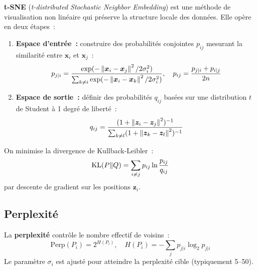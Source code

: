 \begin{definition}[t-SNE]
\textbf{t-SNE} (\emph{t-distributed Stochastic Neighbor Embedding}) est une
m\'ethode de visualisation non lin\'eaire qui pr\'eserve la structure locale
des donn\'ees. Elle op\`ere en deux \'etapes~:

\begin{enumerate}
  \item \textbf{Espace d'entr\'ee~:} construire des probabilit\'es conjointes
    $p_{ij}$ mesurant la similarit\'e entre $\bm{x}_i$ et $\bm{x}_j$~:
    \begin{equation}
      p_{j|i} = \frac{\exp(-\left\| \bm{x}_i - \bm{x}_j \right\|^2 / 2\sigma_i^2)}
      {\sum_{k \neq i} \exp(-\left\| \bm{x}_i - \bm{x}_k \right\|^2 / 2\sigma_i^2)},
      \quad p_{ij} = \frac{p_{j|i} + p_{i|j}}{2n}
    \end{equation}

  \item \textbf{Espace de sortie~:} d\'efinir des probabilit\'es $q_{ij}$
    bas\'ees sur une distribution $t$ de Student \`a 1 degr\'e de libert\'e~:
    \begin{equation}
      q_{ij} = \frac{(1 + \left\| \bm{z}_i - \bm{z}_j \right\|^2)^{-1}}
      {\sum_{k \neq l} (1 + \left\| \bm{z}_k - \bm{z}_l \right\|^2)^{-1}}
    \end{equation}
\end{enumerate}
On minimise la divergence de Kullback-Leibler~:
\begin{equation}
  \mathrm{KL}(P \| Q) = \sum_{i \neq j} p_{ij} \ln \frac{p_{ij}}{q_{ij}}
\end{equation}
par descente de gradient sur les positions $\bm{z}_i$.
\end{definition}

\subsection{Perplexit\'e}

\begin{definition}[Perplexit\'e]
La \textbf{perplexit\'e} contr\^ole le nombre effectif de voisins~:
\begin{equation}
  \text{Perp}(P_i) = 2^{H(P_i)}, \quad H(P_i) = -\sum_j p_{j|i} \log_2 p_{j|i}
\end{equation}
Le param\`etre $\sigma_i$ est ajust\'e pour atteindre la perplexit\'e cible
(typiquement 5--50).
\end{definition}

